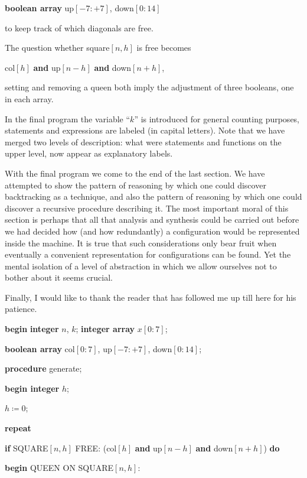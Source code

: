 \quad \textbf{boolean array} up$[-7:+7]$, down$[0:14]$

\noindent
to keep track of which diagonals are free.

The question whether square$[n,h]$ is free becomes

\quad col$[h]$ \textbf{and} up$[n-h]$ \textbf{and} down$[n+h]$,

\noindent
setting and removing a queen both imply the adjustment of three booleans, one in each array.

In the final program the variable ``$k$'' is introduced for general counting purposes, statements and expressions are labeled (in capital letters). Note that we have merged two levels of description: what were statements and functions on the upper level, now appear as explanatory labels.

With the final program we come to the end of the last section. We have attempted to show the pattern of reasoning by which one could discover backtracking as a technique, and also the pattern of reasoning by which one could discover a recursive procedure describing it. The most important moral of this section is perhaps that all that analysis and synthesis could be carried out before we had decided how (and how redundantly) a configuration would be represented inside the machine. It is true that such considerations only bear fruit when eventually a convenient representation for configurations can be found. Yet the mental isolation of a level of abstraction in which we allow ourselves not to bother about it seems crucial.

Finally, I would like to thank the reader that has followed me up till here for his patience.

\newpage

\noindent
\textbf{begin} \textbf{integer} $n$, $k$; \textbf{integer array} $x[0:7]$;

\noindent
\quad \quad \textbf{boolean array} col$[0:7]$, up$[-7:+7]$, down$[0:14]$;

\noindent
\quad \textbf{procedure} generate;

\noindent
\quad \textbf{begin integer} $h$;

\noindent
\quad \quad $h \coloneq 0$;

\noindent
\quad \quad \textbf{repeat}

\noindent
\quad \quad \quad \textbf{if} SQUARE$[n,h]$ FREE: (col$[h]$ \textbf{and} up$[n-h]$ \textbf{and} down$[n+h]$) \textbf{do}

\noindent
\quad \quad \quad \textbf{begin} QUEEN ON SQUARE$[n,h]$:


